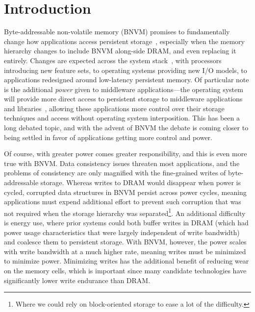 \section{Introduction}

Byte-addressable non-volatile memory (BNVM) promises to fundamentally change
how applications access persistent
storage~\cite{lee_architecting_2009,fox:2001feram,sttram,wong2010phase,intel3dxpoint},
especially when the memory hierarchy changes to include BNVM along-side DRAM,
and even replacing it entirely.
Changes are expected across the system stack~\cite{condit:sosp09}, with
processors introducing new feature sets, to operating systems providing new I/O
models, to applications redesigned around low-latency persistent memory. Of
particular note is the additional \textit{power} given to middleware
applications---the operating system will provide more direct access to
persistent storage to middleware applications and
libraries~\cite{bittman-ssrctr-17-01}, allowing these applications more control
over their storage techniques and access without operating system interposition.
This has been a long debated topic, and with the advent of BNVM the debate is
coming closer to being settled in favor of applications getting more control and
power.

Of course, with greater power comes greater responsibility, and this is even
more true with BNVM. Data consistency issues threaten most applications, and the
problems of consistency are only magnified with the fine-grained writes of
byte-addressable storage. Whereas writes to DRAM would disappear when power is
cycled, corrupted data structures in BNVM persist across power cycles, meaning
applications must expend additional effort to prevent such corruption that was
not required when the storage hierarchy was separated\footnote{Where we could
rely on block-oriented storage to ease a lot of the difficulty.}. An additional
difficulty is energy use, where prior systems could both buffer writes in DRAM
(which had power usage characteristics that were largely independent of write
bandwidth) and coalesce them to persistent storage. With BNVM, however, the
power scales with write bandwidth at a much higher rate, meaning writes must be
minimized to minimize power. Minimizing writes has the additional benefit of
reducing wear on the memory cells, which is important since many candidate
technologies have significantly lower write endurance than DRAM.

